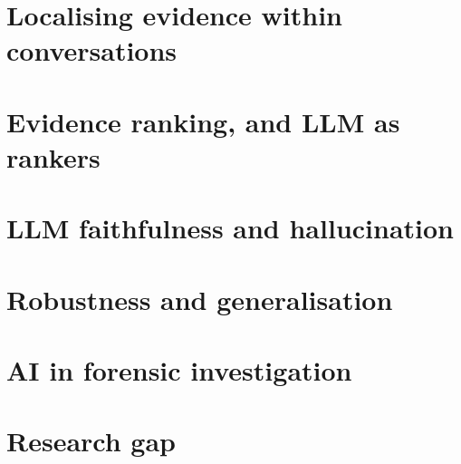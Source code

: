 
\section{Localising evidence within conversations}

\section{Evidence ranking, and LLM as rankers}

\section{LLM faithfulness and hallucination}

\section{Robustness and generalisation}

\section{AI in forensic investigation}

\section{Research gap}